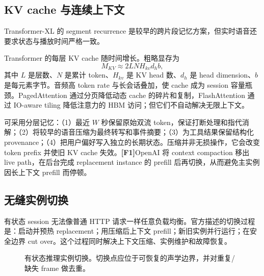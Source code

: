\documentclass[UTF8,fontset=none,a4paper,10pt]{ctexart}
\newcommand{\FOne}{\textcolor{official}{\textbf{[F1]}}}
\begin{document}
\subsection{KV cache 与连续上下文}

Transformer-XL 的 segment recurrence 是较早的跨片段记忆方案\cite{dai2019transformerxl}，但实时语音还要求状态与播放时间严格一致。

Transformer 的每层 KV cache 随时间增长。粗略显存为
\begin{equation}
M_{KV}\approx 2LNH_{kv}d_hb,
\end{equation}
其中 $L$ 是层数、$N$ 是累计 token、$H_{kv}$ 是 KV head 数、$d_h$ 是 head dimension、$b$ 是每元素字节。音频高 token rate 与长会话叠加，使 cache 成为 session 容量瓶颈。PagedAttention 通过分页降低动态 cache 的碎片和复制，FlashAttention 通过 IO-aware tiling 降低注意力的 HBM 访问\cite{kwon2023pagedattention,dao2022flashattention}；但它们不自动解决无限上下文。

可采用分层记忆：（1）最近 $W$ 秒保留原始双流 token，保证打断处理和指代消解；（2）将较早的语音压缩为最终转写和事件摘要；（3）为工具结果保留结构化 provenance；（4）把用户偏好写入独立的长期状态。压缩并非无损操作，它会改变 token prefix 并使旧 KV cache 失效。\FOne OpenAI 将 context compaction 移出 live path，在后台完成 replacement instance 的 prefill 后再切换\cite{openai2026continuous}，从而避免主实例因长上下文 prefill 而停顿。

\subsection{无缝实例切换}

有状态 session 无法像普通 HTTP 请求一样任意负载均衡。官方描述的切换过程是：启动并预热 replacement；用压缩后上下文 prefill；新旧实例并行运行；在安全边界 cut over。这个过程同时解决上下文压缩、实例维护和故障恢复。

\begin{figure}[H]
\centering
{}
\caption{有状态推理实例切换。切换点应位于可恢复的声学边界，并对重复/缺失 frame 做去重。}
\end{figure}
\end{document}
